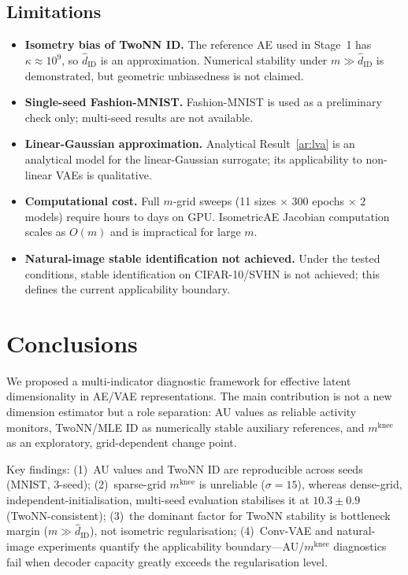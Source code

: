 \documentclass[11pt,a4paper]{article}
\newcommand{\kap}{\kappa}
\newcommand{\mknee}{m^{\mathrm{knee}}}
\newcommand{\hatdID}{\hat{d}_{\mathrm{ID}}}
\begin{document}
\subsection{Limitations}\label{sec:disc_limitation}

\begin{itemize}
\item \textbf{Isometry bias of TwoNN ID.}
The reference AE used in Stage~1 has $\kap\approx10^9$, so $\hatdID$ is an
approximation.
Numerical stability under $m\gg\hatdID$ is demonstrated, but geometric
unbiasedness is not claimed.

\item \textbf{Single-seed Fashion-MNIST.}
Fashion-MNIST is used as a preliminary check only; multi-seed results are not
available.

\item \textbf{Linear-Gaussian approximation.}
Analytical Result~\ref{ar:lva} is an analytical model for the linear-Gaussian
surrogate; its applicability to non-linear VAEs is qualitative.

\item \textbf{Computational cost.}
Full $m$-grid sweeps (11 sizes $\times$ 300 epochs $\times$ 2 models) require
hours to days on GPU.
IsometricAE Jacobian computation scales as $O(m)$ and is impractical for large $m$.

\item \textbf{Natural-image stable identification not achieved.}
Under the tested conditions, stable identification on CIFAR-10/SVHN is not
achieved; this defines the current applicability boundary.
\end{itemize}

\section{Conclusions}\label{sec:conclusion}

We proposed a multi-indicator diagnostic framework for effective latent
dimensionality in AE/VAE representations.
The main contribution is not a new dimension estimator but a role separation:
AU values as reliable activity monitors, TwoNN/MLE ID as numerically stable
auxiliary references, and $\mknee$ as an exploratory, grid-dependent change point.

Key findings:
(1)~AU values and TwoNN ID are reproducible across seeds (MNIST, 3-seed);
(2)~sparse-grid $\mknee$ is unreliable ($\sigma=15$), whereas dense-grid,
independent-initialisation, multi-seed evaluation stabilises it at
$10.3\pm0.9$ (TwoNN-consistent);
(3)~the dominant factor for TwoNN stability is bottleneck margin
($m\gg\hatdID$), not isometric regularisation;
(4)~Conv-VAE and natural-image experiments quantify the applicability
boundary---AU/$\mknee$ diagnostics fail when decoder capacity greatly
exceeds the regularisation level.
\end{document}
